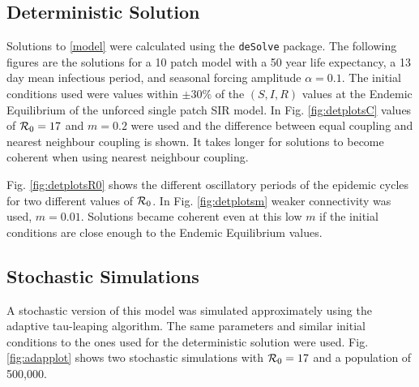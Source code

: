 \documentclass[twocolumn,nofootinbib,showkeys,twoside,floatfix,unsortedaddress,flushbottom,10pt,aps,pra]{report}
\begin{document}
\subsection{Deterministic Solution}
Solutions to \eqref{model} were calculated using the \Rlogo \texttt{deSolve} package. 
The following figures are the solutions for a 10 patch model with a 50 year life expectancy, a 13 day mean infectious period, and seasonal forcing amplitude $\alpha = 0.1$. The initial conditions used were values within $\pm30\%$ of the $(S,I,R)$ values at the Endemic Equilibrium of the unforced single patch SIR model. In Fig. \ref{fig:detplotsC} values of ${\cal R}_0=17$ and $m=0.2$ were used and the difference between equal coupling and nearest neighbour coupling is shown. It takes longer for solutions to become coherent when using nearest neighbour coupling. \par
 \smallskip \qquad

Fig. \ref{fig:detplotsR0} shows the different oscillatory periods of the epidemic cycles for two different values of ${\cal R}_0$. 
In Fig. \ref{fig:detplotsm} weaker connectivity was used, $m=0.01$. Solutions became coherent even at this low $m$ if the initial conditions are close enough to the Endemic Equilibrium values. 

\subsection{Stochastic Simulations} 
\indent
A stochastic version of this model was simulated approximately using the adaptive tau-leaping algorithm. The same parameters and similar initial conditions to the ones used for the deterministic solution were used. Fig. \ref{fig:adapplot} shows two stochastic simulations with ${\cal R}_0=17$ and a population of 500,000.

\begin{figure*}
    \caption{An approximate stochastic simulation using the adaptive tau-leaping method.}
    \label{fig:adapplot}
    \centering
    }
    \subfigure[$m=0.01$]
    {
        \texttt{[image: \{images/adaptauECR017m0.01]}.pdf}
    }   
\end{figure*}
\end{document}
